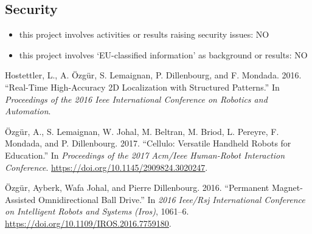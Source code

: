 \documentclass[]{article}
\begin{document}
\subsection{Security}\label{security}

\begin{itemize}

\item
  this project involves activities or results raising security issues:
  NO
\item
  this project involves `EU-classified information' as background or
  results: NO
\end{itemize}

\hypertarget{refs}{}
\leavevmode\hypertarget{ref-hostettler2016realtime}{}%
Hostettler, L., A. Özgür, S. Lemaignan, P. Dillenbourg, and F. Mondada.
2016. ``Real-Time High-Accuracy 2D Localization with Structured
Patterns.'' In \emph{Proceedings of the 2016 Ieee International
Conference on Robotics and Automation}.

\leavevmode\hypertarget{ref-ozgur2017cellulo}{}%
Özgür, A., S. Lemaignan, W. Johal, M. Beltran, M. Briod, L. Pereyre, F.
Mondada, and P. Dillenbourg. 2017. ``Cellulo: Versatile Handheld Robots
for Education.'' In \emph{Proceedings of the 2017 Acm/Ieee Human-Robot
Interaction Conference}. \url{https://doi.org/10.1145/2909824.3020247}.

\leavevmode\hypertarget{ref-ozgur2016permanent}{}%
Özgür, Ayberk, Wafa Johal, and Pierre Dillenbourg. 2016. ``Permanent
Magnet-Assisted Omnidirectional Ball Drive.'' In \emph{2016 Ieee/Rsj
International Conference on Intelligent Robots and Systems (Iros)},
1061--6. \url{https://doi.org/10.1109/IROS.2016.7759180}.
\end{document}
